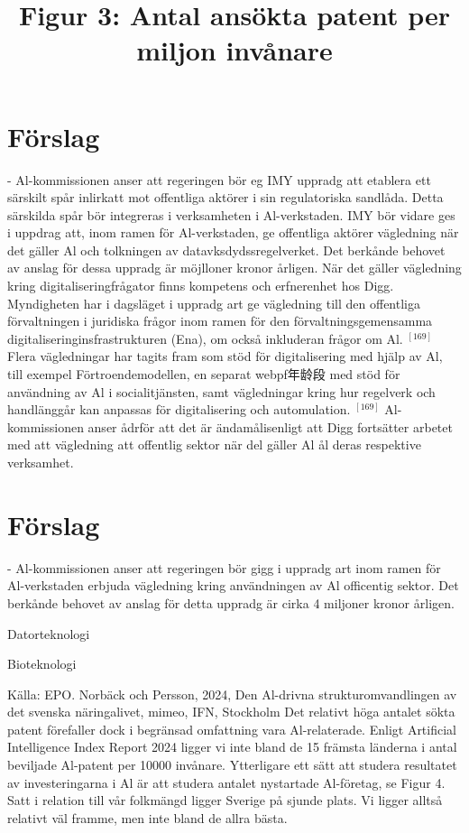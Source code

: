 {{{{{{\section*{Förslag}
- Al-kommissionen anser att regeringen bör eg IMY uppradg att etablera ett särskilt spår inlirkatt mot offentliga aktörer i sin regulatoriska sandlåda. Detta särskilda spår bör integreras i verksamheten i Al-verkstaden. IMY bör vidare ges i uppdrag att, inom ramen för Al-verkstaden, ge offentliga aktörer vägledning när det gäller Al och tolkningen av datavksdydssregelverket. Det berkånde behovet av anslag för dessa uppradg är möjlloner kronor årligen.
När det gäller vägledning kring digitaliseringfrågator finns kompetens och erfnerenhet hos Digg. Myndigheten har i dagsläget i uppradg art ge vägledning till den offentliga förvaltningen i juridiska frågor inom ramen för den förvaltningsgemensamma digitaliseringinsfrastrukturen (Ena), om också inkluderan frågor om Al. \({ }^{[169]}\) Flera vägledningar har tagits fram som stöd för digitalisering med hjälp av Al, till exempel Förtroendemodellen, en separat webpf年龄段 med stöd för användning av Al i socialitjänsten, samt vägledningar kring hur regelverk och handlänggår kan anpassas för digitalisering och automulation. \({ }^{[169]}\) Al-kommissionen anser ådrför att det är ändamålisenligt att Digg fortsätter arbetet med att vägledning att offentlig sektor när del gäller Al ål deras respektive verksamhet.
\section*{Förslag}
- Al-kommissionen anser att regeringen bör gigg i uppradg art inom ramen för Al-verkstaden erbjuda vägledning kring användningen av Al officentig sektor. Det berkånde behovet av anslag för detta uppradg är cirka 4 miljoner kronor årligen.

\title{
Figur 3: Antal ansökta patent per miljon invånare
}
Datorteknologi

Bioteknologi

Källa: EPO. Norbäck och Persson, 2024, Den Al-drivna strukturomvandlingen av det svenska näringalivet, mimeo, IFN, Stockholm
Det relativt höga antalet sökta patent förefaller dock i begränsad omfattning vara Al-relaterade. Enligt Artificial Intelligence Index Report 2024 ligger vi inte bland de 15 främsta länderna i antal beviljade Al-patent per 10000 invånare.
Ytterligare ett sätt att studera resultatet av investeringarna i Al är att studera antalet nystartade Al-företag, se Figur 4. Satt i relation till vår folkmängd ligger Sverige på sjunde plats. Vi ligger alltså relativt väl framme, men inte bland de allra bästa.

}}}}}}

